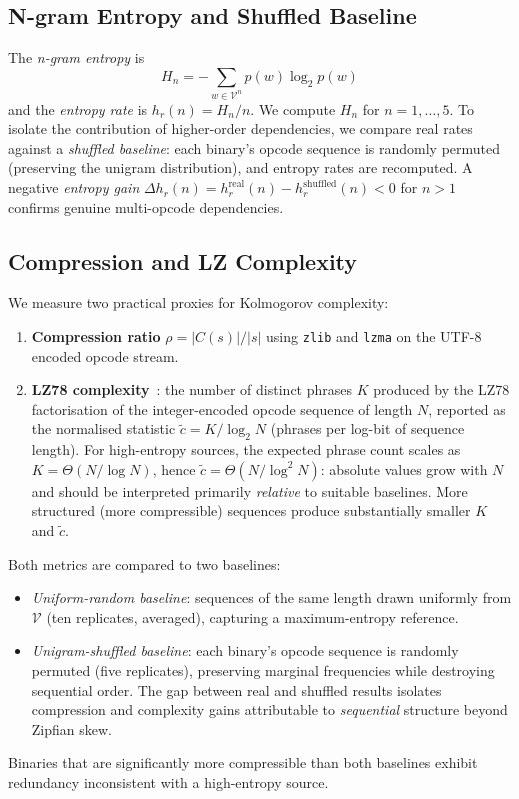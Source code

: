 \documentclass[10pt,twocolumn]{article}
\newcommand{\zlib}{\texttt{zlib}}
\newcommand{\lzma}{\texttt{lzma}}
\begin{document}
\subsection{N-gram Entropy and Shuffled Baseline}

The \emph{n-gram entropy} is
\begin{equation}
  H_n = -\sum_{w \in \mathcal{V}^n} p(w) \log_2 p(w)
\end{equation}
and the \emph{entropy rate} is $h_r(n) = H_n / n$.  We compute $H_n$ for
$n = 1,\ldots,5$.  To isolate the contribution of higher-order dependencies, we
compare real rates against a \emph{shuffled baseline}: each binary's opcode
sequence is randomly permuted (preserving the unigram distribution), and entropy
rates are recomputed.  A negative \emph{entropy gain}
$\Delta h_r(n) = h_r^{\text{real}}(n) - h_r^{\text{shuffled}}(n) < 0$
for $n > 1$ confirms genuine multi-opcode dependencies.

\subsection{Compression and LZ Complexity}

We measure two practical proxies for Kolmogorov complexity:
\begin{enumerate}
  \item \textbf{Compression ratio} $\rho = |C(s)| / |s|$ using \zlib{} and
        \lzma{} on the UTF-8 encoded opcode stream.
  \item \textbf{LZ78 complexity}~\cite{ziv1978compression}: the number of
        distinct phrases $K$ produced by the LZ78 factorisation of the
        integer-encoded opcode sequence of length $N$, reported as the
        normalised statistic $\tilde{c} = K / \log_2 N$ (phrases per log-bit of
        sequence length).  For high-entropy sources, the expected phrase count
        scales as $K = \Theta(N/\log N)$, hence $\tilde{c} = \Theta(N/\log^2 N)$:
        absolute values grow with $N$ and should be interpreted primarily
        \emph{relative} to suitable baselines.  More structured (more
        compressible) sequences produce substantially smaller $K$ and $\tilde{c}$.
\end{enumerate}

Both metrics are compared to two baselines:
\begin{itemize}
  \item \emph{Uniform-random baseline}: sequences of the same length drawn
        uniformly from $\mathcal{V}$ (ten replicates, averaged), capturing a
        maximum-entropy reference.
  \item \emph{Unigram-shuffled baseline}: each binary's opcode sequence is
        randomly permuted (five replicates), preserving marginal frequencies
        while destroying sequential order.  The gap between real and shuffled
        results isolates compression and complexity gains attributable to
        \emph{sequential} structure beyond Zipfian skew.
\end{itemize}
Binaries that are significantly more compressible than both baselines exhibit
redundancy inconsistent with a high-entropy source.
\end{document}
